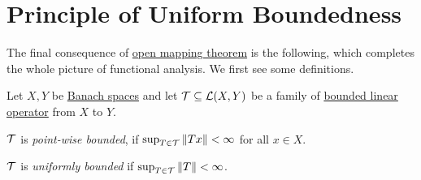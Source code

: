 \section{Principle of Uniform Boundedness}
The final consequence of \hyperref[thm:open-mapping]{open mapping theorem} is the following, which completes the whole picture of functional analysis. We first see some definitions.

\begin{definition*}
	Let \(X, Y\) be \hyperref[def:Banach-space]{Banach spaces} and let \(\mathcal{\MakeUppercase{T}} \subseteq \mathcal{\MakeUppercase{l}} (X, Y)\) be a family of \hyperref[def:bounded-linear-op]{bounded linear operator} from \(X\) to \(Y\).
	\begin{definition}\label{def:point-wise-bounded}
		\(\mathcal{\MakeUppercase{t}} \) is \emph{point-wise bounded}, if \(\sup _{T\in \mathcal{\MakeUppercase{t}} } \left\lVert Tx\right\rVert < \infty\) for all \(x\in X\).
	\end{definition}
	\begin{definition}\label{def:uniformly-bounded}
		\(\mathcal{\MakeUppercase{t}} \) is \emph{uniformly bounded} if \(\sup _{T\in \mathcal{\MakeUppercase{t}} }\left\lVert T\right\rVert < \infty \).
	\end{definition}
\end{definition*}

